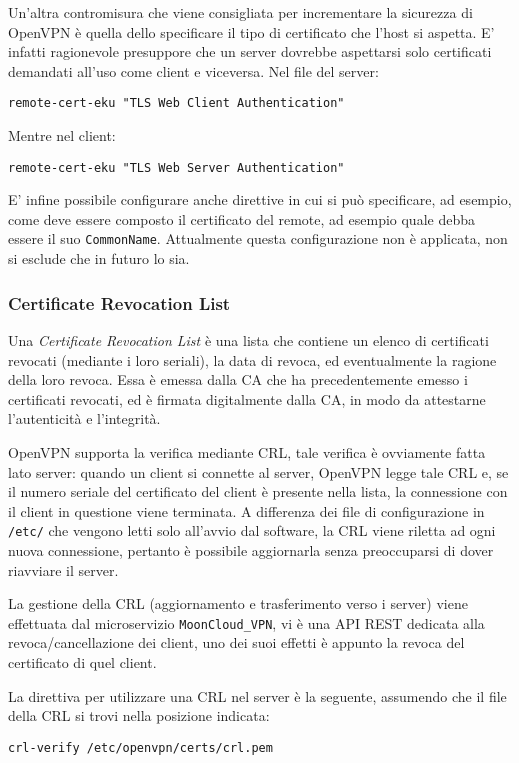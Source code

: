 Un'altra contromisura che viene consigliata per incrementare la sicurezza di OpenVPN
è quella dello specificare il tipo di certificato che l'host si aspetta.
E' infatti ragionevole presuppore che un server dovrebbe aspettarsi solo certificati
demandati all'uso come client e viceversa.
Nel file del server:
\begin{verbatim}
remote-cert-eku "TLS Web Client Authentication"
\end{verbatim}
Mentre nel client:
\begin{verbatim}
remote-cert-eku "TLS Web Server Authentication"
\end{verbatim}


E' infine possibile configurare anche direttive in cui si può specificare, ad esempio,
come deve essere composto il certificato del remote, ad esempio quale debba essere il suo \texttt{CommonName}.
Attualmente questa configurazione non è applicata, non si esclude che in futuro lo sia.


\subsubsection{Certificate Revocation List}
Una \textit{Certificate Revocation List} è una lista che contiene un elenco di certificati
revocati (mediante i loro seriali), la data di revoca, ed eventualmente la ragione della loro revoca.
Essa è emessa dalla CA che ha precedentemente emesso i certificati revocati, ed è firmata digitalmente
dalla CA, in modo da attestarne l'autenticità e l'integrità.

OpenVPN supporta la verifica mediante CRL, tale verifica è ovviamente fatta lato server: quando
un client si connette al server, OpenVPN legge tale CRL e, se il numero seriale del certificato
del client è presente nella lista, la connessione con il client in questione viene terminata.
A differenza dei file di configurazione in \texttt{/etc/} che vengono letti solo all'avvio
dal software, la CRL viene riletta ad ogni nuova connessione, pertanto è possibile aggiornarla senza
preoccuparsi di dover riavviare il server.

La gestione della CRL (aggiornamento e trasferimento verso i server) viene effettuata dal microservizio
\texttt{MoonCloud\_VPN}, vi è una API REST dedicata alla revoca/cancellazione dei client, uno
dei suoi effetti è appunto la revoca del certificato di quel client.

La direttiva per utilizzare una CRL nel server è la seguente, assumendo che il file della CRL
si trovi nella posizione indicata:
\begin{verbatim}
crl-verify /etc/openvpn/certs/crl.pem
\end{verbatim}
